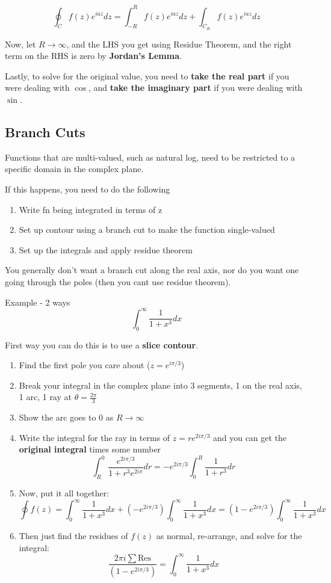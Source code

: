 \documentclass{article}
\begin{document}
$$
\oint_{C} f(z) e^{iaz}dz = \int_{-R}^{R} f(z)e^{iaz} dz + \int_{C_R} f(z) e^{iaz} dz
$$

Now, let $R\to\infty$, and the LHS you get using Residue Theorem, and the right term on the RHS is zero by \textbf{Jordan's Lemma}. 

Lastly, to solve for the original value, you need to \textbf{take the real part} if you were dealing with $\cos$, and \textbf{take the imaginary part} if you were dealing with $\sin$.

\subsection{Branch Cuts}

Functions that are multi-valued, such as natural log, need to be restricted to a specific domain in the complex plane.

If this happens, you need to do the following

\begin{enumerate}
    \item Write fn being integrated in terms of z
    \item Set up contour using a branch cut to make the function single-valued
    \item Set up the integrals and apply residue theorem
\end{enumerate}

You generally don't want a branch cut along the real axis, nor do you want one going through the poles (then you cant use residue theorem).

Example - 2 ways
$$
\int_{0}^{\infty} \frac{1}{1+x^3} dx
$$

First way you can do this is to use a \textbf{slice contour}.  
\begin{enumerate}
    \item Find the first pole you care about ($z = e^{i\pi/3}$)
    \item Break your integral in the complex plane into 3 segments, 1 on the real axis, 1 arc, 1 ray at $\theta = \frac{2\pi}{3}$
    \item Show the arc goes to 0 as $R \to \infty$
    \item Write the integral for the ray in terms of $z = re^{2i\pi/3}$ and you can get the \textbf{original integral} times some number
    $$ \int_{R}^{0} \frac{e^{2i\pi/3}}{1+r^3e^{2i\pi}} dr = - e^{2i\pi/3} \int_{0}^{R} \frac{1}{1+r^3} dr $$
    \item Now, put it all together:
    $$
    \oint f(z) = \int_{0}^{\infty} \frac{1}{1+x^3} dx + (-e^{2i\pi/3})\int_{0}^{\infty} \frac{1}{1+x^3} dx = (1-e^{2i\pi/3}) \int_{0}^{\infty} \frac{1}{1+x^3} dx 
    $$
    \item Then just find the residues of $f(z)$ as normal, re-arrange, and solve for the integral:
    $$
    \frac{2\pi i \sum \text{Res}}{(1-e^{2i\pi/3})} = \int_{0}^{\infty} \frac{1}{1+x^3} dx
    $$
\end{enumerate}
\end{document}
